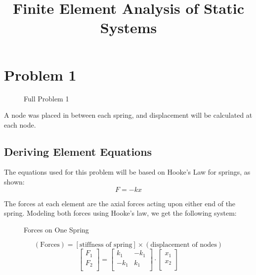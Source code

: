 \documentclass[8pt]{article}
\title{Finite Element Analysis of Static Systems}
\begin{document}
 

\section{Problem 1}
\label{sec:Problem 1}

\begin{figure}[h!]
    \centering
    \caption{Full Problem 1}
\end{figure}

A node was placed in between each spring, and displacement will be calculated at each node.

\subsection{Deriving Element Equations}

The equations used for this problem will be based on Hooke's Law for springs, as shown:
\[
F = -kx
\]

The forces at each element are the axial forces acting upon either end of the spring. Modeling both forces using Hooke's law, we get the following system:
\begin{figure}[h!]
    \centering
    \caption{Forces on One Spring}
\end{figure}
\[
(\text{Forces}) = [\text{stiffness of spring}] \times (\text{displacement of nodes})
\]
\[
\begin{bmatrix}
    F_1 \\
    F_2 \\
\end{bmatrix}
=
\begin{bmatrix}
    k_1 & -k_1 \\
    -k_1 & k_1 \\
\end{bmatrix}
\cdot
\begin{bmatrix}
    x_1 \\
    x_2 \\
\end{bmatrix}
\]
\end{document}
